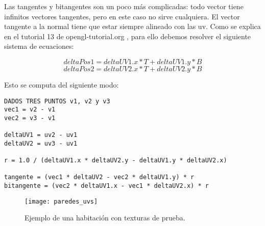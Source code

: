 Las tangentes y bitangentes son un poco más complicadas: todo vector tiene infinitos vectores tangentes, pero en este caso no sirve cualquiera. El vector tangente a la normal tiene que estar siempre alineado con las uv.
\clearpage
Como se explica en el tutorial 13 de opengl-tutorial.org , para ello debemos resolver el siguiente sistema de ecuaciones:


\[ deltaPos1 = deltaUV1.x * T + deltaUV1.y * B \]
\[ deltaPos2 = deltaUV2.x * T + deltaUV2.y * B \]

Esto se computa del siguiente modo:

\begin{lstlisting}
DADOS TRES PUNTOS v1, v2 y v3
vec1 = v2 - v1
vec2 = v3 - v1

deltaUV1 = uv2 - uv1
deltaUV2 = uv3 - uv1

r = 1.0 / (deltaUV1.x * deltaUV2.y - deltaUV1.y * deltaUV2.x)

tangente = (vec1 * deltaUV2 - vec2 * deltaUV1.y) * r
bitangente = (vec2 * deltaUV1.x - vec1 * deltaUV2.x) * r
\end{lstlisting}

\begin{figure}[H]
    \centering
    \texttt{[image: paredes\_uvs]}
    \caption{Ejemplo de una habitación con texturas de prueba.}
    \label{fig:ejemplo_con_uvs}
\end{figure}
